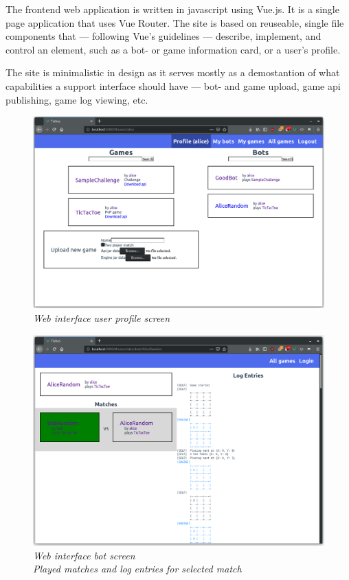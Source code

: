 	The frontend web application is written in javascript using Vue.js. It is a single page application that uses Vue Router. 
	The site is based on reuseable, single file components that --- following Vue's guidelines --- describe, implement, and control an element, such as a bot- or game information card, or a user's profile.
	
	The site is minimalistic in design as it serves mostly as a demostantion of what capabilities a support interface should have --- bot- and game upload, game api publishing, game log viewing, etc.

	\vfill
	\begin{figure}[!ht]
		\centering
		\includegraphics[width=150mm, keepaspectratio]{figures/profile.png}
		\caption*{\emph{Web interface user profile screen}} 
	\end{figure}
	\vfill

	\begin{figure}[!ht]
		\centering
		\includegraphics[width=150mm, keepaspectratio]{figures/match-log.png}
		\caption*{\emph{Web interface bot screen} \\ \emph{Played matches and log entries for selected match}} 
	\end{figure}

%













